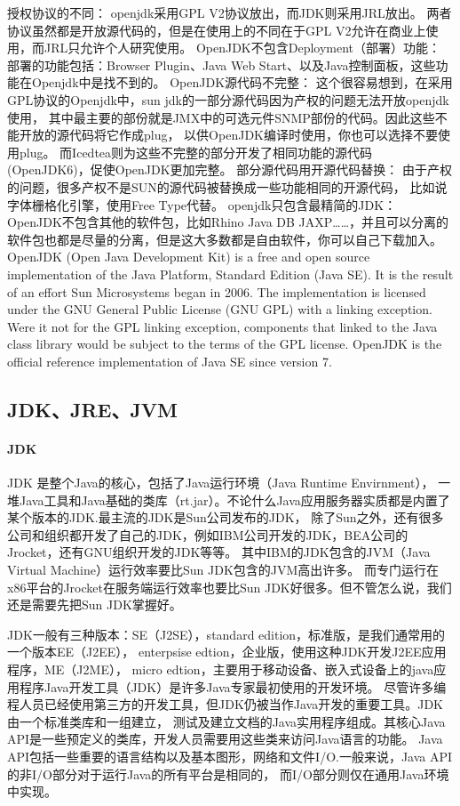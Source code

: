 \documentclass{book}
\begin{document}
授权协议的不同：
openjdk采用GPL V2协议放出，而JDK则采用JRL放出。
两者协议虽然都是开放源代码的，但是在使用上的不同在于GPL V2允许在商业上使用，而JRL只允许个人研究使用。
OpenJDK不包含Deployment（部署）功能：
部署的功能包括：Browser Plugin、Java Web Start、以及Java控制面板，这些功能在Openjdk中是找不到的。
OpenJDK源代码不完整：
这个很容易想到，在采用GPL协议的Openjdk中，sun jdk的一部分源代码因为产权的问题无法开放openjdk使用，
其中最主要的部份就是JMX中的可选元件SNMP部份的代码。因此这些不能开放的源代码将它作成plug，
以供OpenJDK编译时使用，你也可以选择不要使用plug。
而Icedtea则为这些不完整的部分开发了相同功能的源代码(OpenJDK6)，促使OpenJDK更加完整。
部分源代码用开源代码替换：
由于产权的问题，很多产权不是SUN的源代码被替换成一些功能相同的开源代码，
比如说字体栅格化引擎，使用Free Type代替。
openjdk只包含最精简的JDK：
OpenJDK不包含其他的软件包，比如Rhino Java DB JAXP……，并且可以分离的软件包也都是尽量的分离，但是这大多数都是自由软件，你可以自己下载加入。 
OpenJDK (Open Java Development Kit) is a free and open source 
implementation of the Java Platform, Standard Edition (Java SE).
It is the result of an effort Sun Microsystems began in 2006. 
The implementation is licensed under the GNU General Public 
License (GNU GPL) with a linking exception. 
Were it not for the GPL linking exception, 
components that linked to the Java class library would be subject 
to the terms of the GPL license. 
OpenJDK is the official reference implementation of Java SE since version 7.

\subsection{JDK、JRE、JVM}

\paragraph{JDK}
JDK 是整个Java的核心，包括了Java运行环境（Java Runtime Envirnment），
一堆Java工具和Java基础的类库（rt.jar）。不论什么Java应用服务器实质都是内置了某个版本的JDK.最主流的JDK是Sun公司发布的JDK，
除了Sun之外，还有很多公司和组织都开发了自己的JDK，例如IBM公司开发的JDK，BEA公司的Jrocket，还有GNU组织开发的JDK等等。
其中IBM的JDK包含的JVM（Java Virtual Machine）运行效率要比Sun JDK包含的JVM高出许多。
而专门运行在x86平台的Jrocket在服务端运行效率也要比Sun JDK好很多。但不管怎么说，我们还是需要先把Sun JDK掌握好。

JDK一般有三种版本：SE（J2SE），standard edition，标准版，是我们通常用的一个版本EE（J2EE），
enterpsise edtion，企业版，使用这种JDK开发J2EE应用程序，ME（J2ME），
micro edtion，主要用于移动设备、嵌入式设备上的java应用程序Java开发工具（JDK）是许多Java专家最初使用的开发环境。
尽管许多编程人员已经使用第三方的开发工具，但JDK仍被当作Java开发的重要工具。JDK由一个标准类库和一组建立，
测试及建立文档的Java实用程序组成。其核心Java API是一些预定义的类库，开发人员需要用这些类来访问Java语言的功能。
Java API包括一些重要的语言结构以及基本图形，网络和文件I/O.一般来说，Java API的非I/O部分对于运行Java的所有平台是相同的，
而I/O部分则仅在通用Java环境中实现。
\end{document}
